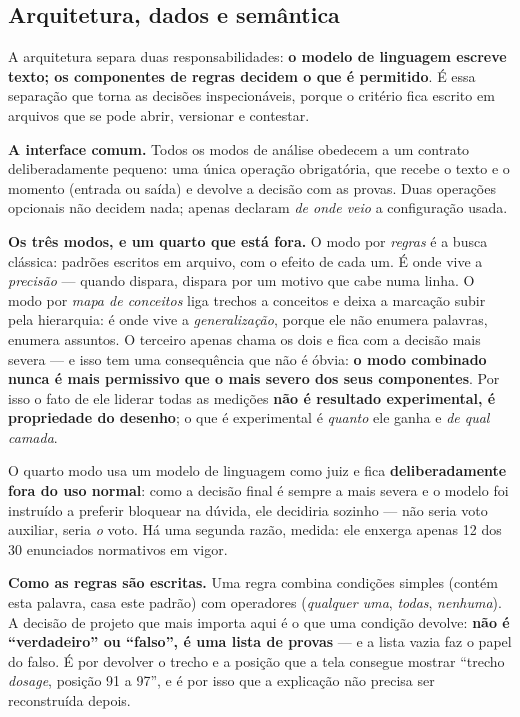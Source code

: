 \documentclass[10pt]{article}
\begin{document}
\subsection{Arquitetura, dados e semântica}

A arquitetura separa duas responsabilidades: \textbf{o modelo de linguagem escreve texto; os componentes de regras decidem o que é permitido}. É essa separação que torna as decisões inspecionáveis, porque o critério fica escrito em arquivos que se pode abrir, versionar e contestar.

\textbf{A interface comum.} Todos os modos de análise obedecem a um contrato deliberadamente pequeno: uma única operação obrigatória, que recebe o texto e o momento (entrada ou saída) e devolve a decisão com as provas. Duas operações opcionais não decidem nada; apenas declaram \emph{de onde veio} a configuração usada.

\textbf{Os três modos, e um quarto que está fora.} O modo por \emph{regras} é a busca clássica: padrões escritos em arquivo, com o efeito de cada um. É onde vive a \emph{precisão} --- quando dispara, dispara por um motivo que cabe numa linha. O modo por \emph{mapa de conceitos} liga trechos a conceitos e deixa a marcação subir pela hierarquia: é onde vive a \emph{generalização}, porque ele não enumera palavras, enumera assuntos. O terceiro apenas chama os dois e fica com a decisão mais severa --- e isso tem uma consequência que não é óbvia: \textbf{o modo combinado nunca é mais permissivo que o mais severo dos seus componentes}. Por isso o fato de ele liderar todas as medições \textbf{não é resultado experimental, é propriedade do desenho}; o que é experimental é \emph{quanto} ele ganha e \emph{de qual camada}.

O quarto modo usa um modelo de linguagem como juiz e fica \textbf{deliberadamente fora do uso normal}: como a decisão final é sempre a mais severa e o modelo foi instruído a preferir bloquear na dúvida, ele decidiria sozinho --- não seria voto auxiliar, seria \emph{o} voto. Há uma segunda razão, medida: ele enxerga apenas 12 dos 30 enunciados normativos em vigor.

\textbf{Como as regras são escritas.} Uma regra combina condições simples (contém esta palavra, casa este padrão) com operadores (\emph{qualquer uma}, \emph{todas}, \emph{nenhuma}). A decisão de projeto que mais importa aqui é o que uma condição devolve: \textbf{não é ``verdadeiro'' ou ``falso'', é uma lista de provas} --- e a lista vazia faz o papel do falso. É por devolver o trecho e a posição que a tela consegue mostrar ``trecho \emph{dosage}, posição 91 a 97'', e é por isso que a explicação não precisa ser reconstruída depois.
\end{document}
